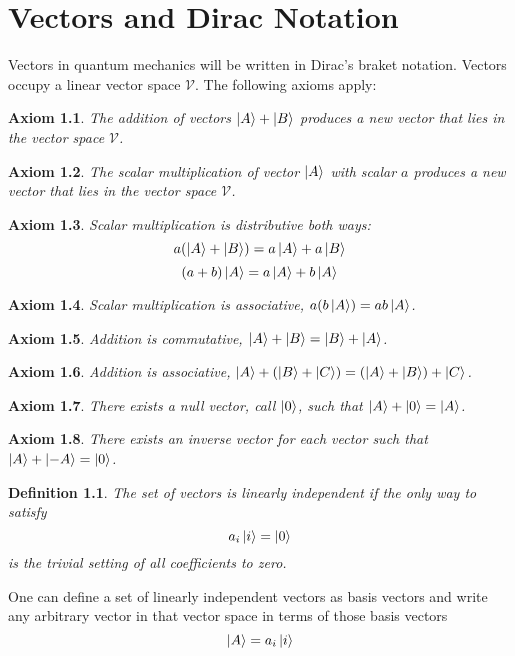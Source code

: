 \documentclass{tufte-book}
\newtheorem{axiom}{Axiom}
\newtheorem{definition}{Definition}
\begin{document}
\chapter{Vectors and Dirac Notation}
\label{ch:braket}
Vectors in quantum mechanics will be written in Dirac's braket notation. Vectors occupy a linear vector space $\mathcal{V}$. The following axioms apply:
\begin{axiom}
	\label{ax:1}
	The addition of vectors $\ket{A} + \ket{B}$ produces a new vector that lies in the vector space $\mathcal{V}$.
\end{axiom}
\begin{axiom}
	\label{ax:2}
	The scalar multiplication of vector $\ket{A}$ with scalar $a$ produces a new vector that lies in the vector space $\mathcal{V}$.
\end{axiom}
\begin{axiom}
	Scalar multiplication is distributive both ways:
	\[
		\label{ax:3.1}
		a(\ket{A} + \ket{B}) = a\ket{A} + a\ket{B}
	\]
	\[
		\label{ax:3.2}
		(a+b)\ket{A} = a\ket{A} + b\ket{A}
	\]
\end{axiom}
\begin{axiom}
	\label{ax:4}
	Scalar multiplication is associative, $a(b\ket{A}) = ab\ket{A}$.
\end{axiom}
\begin{axiom}
	\label{ax:5}
	Addition is commutative, $\ket{A} + \ket{B} = \ket{B} + \ket{A}$.
\end{axiom}
\begin{axiom}
	\label{ax:6}
	Addition is associative, $\ket{A} + (\ket{B} + \ket{C}) = (\ket{A} + \ket{B}) + \ket{C}$.
\end{axiom}
\begin{axiom}
	\label{ax:7}
	There exists a null vector, call $\ket{0}$, such that $\ket{A} + \ket{0} = \ket{A}$.
\end{axiom}
\begin{axiom}
	\label{ax:8}
	There exists an inverse vector for each vector such that $\ket{A} + \ket{-A} = \ket{0}$.
\end{axiom}

\begin{definition}
	\label{def:1}
	The set of vectors is linearly independent if the only way to satisfy
	\[
		a_i\ket{i} = \ket{0}
	\]
	is the trivial setting of all coefficients to zero.
\end{definition}

One can define a set of linearly independent vectors as basis vectors and write any arbitrary vector in that vector space in terms of those basis vectors
\begin{equation}
	\label{eq:1}
	\ket{A} = a_i\ket{i}
\end{equation}
\end{document}
